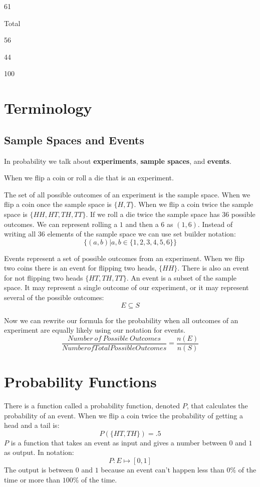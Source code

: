 \documentclass[]{book}
\begin{document}
61

Total

56

44

100

\section{Terminology}\label{terminology}

\subsection{Sample Spaces and Events}\label{sample-spaces-and-events}

In probability we talk about \textbf{experiments}, \textbf{sample
spaces}, and \textbf{events}.

When we flip a coin or roll a die that is an experiment.

The set of all possible outcomes of an experiment is the sample space.
When we flip a coin once the sample space is \(\{H,T\}\). When we flip a
coin twice the sample space is \(\{HH,HT,TH,TT\}\). If we roll a die
twice the sample space has 36 possible outcomes. We can represent
rolling a \(1\) and then a \(6\) as \((1,6)\). Instead of writing all 36
elements of the sample space we can use set builder notation:
\[\{(a,b)|a,b \in \{1,2,3,4,5,6\}\}\]

Events represent a set of possible outcomes from an experiment. When we
flip two coins there is an event for flipping two heads, \(\{HH\}\).
There is also an event for not flipping two heads \(\{HT,TH,TT\}\). An
event is a subset of the sample space. It may represent a single outcome
of our experiment, or it may represent several of the possible outcomes:
\[E \subseteq S\]

Now we can rewrite our formula for the probability when all outcomes of
an experiment are equally likely using our notation for events.
\[\frac{Number \ of \ Possible \ Outcomes}{Number of Total Possible Outcomes} = \frac{n(E)}{n(S)}\]

\section{Probability Functions}\label{probability-functions}

There is a function called a probability function, denoted \(P\), that
calculates the probability of an event. When we flip a coin twice the
probability of getting a head and a tail is: \[P(\{HT, TH\})=.5\] \(P\)
is a function that takes an event as input and gives a number between
\(0\) and \(1\) as output. In notation: \[P:E \mapsto [0,1]\] The output
is between \(0\) and \(1\) because an event can't happen less than
\(0\%\) of the time or more than \(100\%\) of the time.
\end{document}
